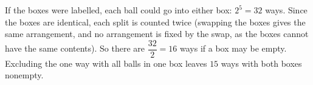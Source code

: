 If the boxes were labelled, each ball could go into either box: $2^5=32$ ways. Since the boxes are identical, each split is counted twice (swapping the boxes gives the same arrangement, and no arrangement is fixed by the swap, as the boxes cannot have the same contents). So there are $\dfrac{32}{2}=\boxed{16}$ ways if a box may be empty. Excluding the one way with all balls in one box leaves $\boxed{15}$ ways with both boxes nonempty.

